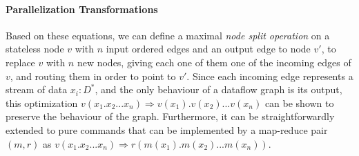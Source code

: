 \documentclass[sigplan,10pt,review,anonymous]{acmart}
\newcommand{\tr}[1]{} %
\begin{document}
\paragraph{Parallelization Transformations}
%
Based on these equations, we can define a maximal \emph{node split
  operation} on a stateless node $v$ with $n$ input ordered edges and
an output edge to node $v'$, to replace $v$ with $n$ new nodes, giving
each one of them one of the incoming edges of $v$, and routing them in
order to point to $v'$. Since each incoming edge represents a stream
of data $x_i : D^*$, and the only behaviour of a dataflow graph is its
output, this optimization $ v(x_1.x_2...x_n) \Rightarrow
v(x_1).v(x_2)...v(x_n)$ can be shown to preserve the behaviour of the
graph. Furthermore, it can be straightforwardly extended to pure
commands that can be implemented by a map-reduce pair $(m, r)$ as $
v(x_1.x_2...x_n) \Rightarrow r(m(x_1).m(x_2)...m(x_n))$.

\tr{Remember to mention the assumptions that need to hold for the
  graph transformations to be valid in the Command categories
  section. Commands must be deterministic, they must not do any other
  side effect (such as writing to other files, sending signals,
  etc). However, these assumptions must already be checked when the
  developer designates the categories.}

\tr{If there is time I can work out a formal definition and a proof
  sketch why this transformation preserves the output of the dataflow
  graph.}


\end{document}
